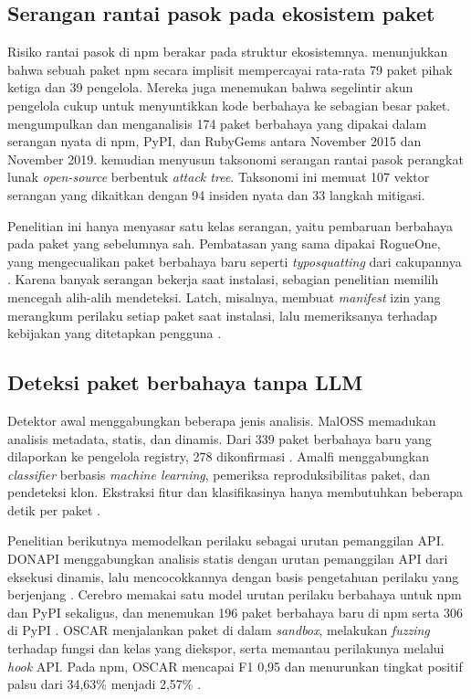 \documentclass[a4paper,fleqn]{cas-dc}
\begin{document}
\subsection{Serangan rantai pasok pada ekosistem paket}

Risiko rantai pasok di npm berakar pada struktur ekosistemnya.
\citet{zimmermann2019small} menunjukkan bahwa sebuah paket npm secara implisit
mempercayai rata-rata 79 paket pihak ketiga dan 39 pengelola. Mereka juga
menemukan bahwa segelintir akun pengelola cukup untuk menyuntikkan kode
berbahaya ke sebagian besar paket. \citet{ohm2020backstabber} mengumpulkan dan
menganalisis 174 paket berbahaya yang dipakai dalam serangan nyata di npm, PyPI,
dan RubyGems antara November 2015 dan November 2019. \citet{ladisa2023sok}
kemudian menyusun taksonomi serangan rantai pasok perangkat lunak
\emph{open-source} berbentuk \emph{attack tree}. Taksonomi ini memuat 107 vektor
serangan yang dikaitkan dengan 94 insiden nyata dan 33 langkah mitigasi.

Penelitian ini hanya menyasar satu kelas serangan, yaitu pembaruan berbahaya pada
paket yang sebelumnya sah. Pembatasan yang sama dipakai RogueOne, yang
mengecualikan paket berbahaya baru seperti \emph{typosquatting} dari cakupannya
\citep{sofaer2024rogueone}. Karena banyak serangan bekerja saat instalasi,
sebagian penelitian memilih mencegah alih-alih mendeteksi. Latch, misalnya,
membuat \emph{manifest} izin yang merangkum perilaku setiap paket saat
instalasi, lalu memeriksanya terhadap kebijakan yang ditetapkan pengguna
\citep{wyss2022wolf}.

\subsection{Deteksi paket berbahaya tanpa LLM}

Detektor awal menggabungkan beberapa jenis analisis. MalOSS memadukan analisis
metadata, statis, dan dinamis. Dari 339 paket berbahaya baru yang dilaporkan ke
pengelola registry, 278 dikonfirmasi \citep{duan2021towards}. Amalfi
menggabungkan \emph{classifier} berbasis \emph{machine learning}, pemeriksa
reproduksibilitas paket, dan pendeteksi klon. Ekstraksi fitur dan klasifikasinya
hanya membutuhkan beberapa detik per paket \citep{sejfia2022practical}.

Penelitian berikutnya memodelkan perilaku sebagai urutan pemanggilan API. DONAPI
menggabungkan analisis statis dengan urutan pemanggilan API dari eksekusi
dinamis, lalu mencocokkannya dengan basis pengetahuan perilaku yang berjenjang
\citep{huang2024donapi}. Cerebro memakai satu model urutan perilaku berbahaya
untuk npm dan PyPI sekaligus, dan menemukan 196 paket berbahaya baru di npm serta
306 di PyPI \citep{zhang2025killing}. OSCAR menjalankan paket di dalam
\emph{sandbox}, melakukan \emph{fuzzing} terhadap fungsi dan kelas yang diekspor,
serta memantau perilakunya melalui \emph{hook} API. Pada npm, OSCAR mencapai F1
0,95 dan menurunkan tingkat positif palsu dari 34,63\% menjadi 2,57\%
\citep{zheng2024towards}.
\end{document}
